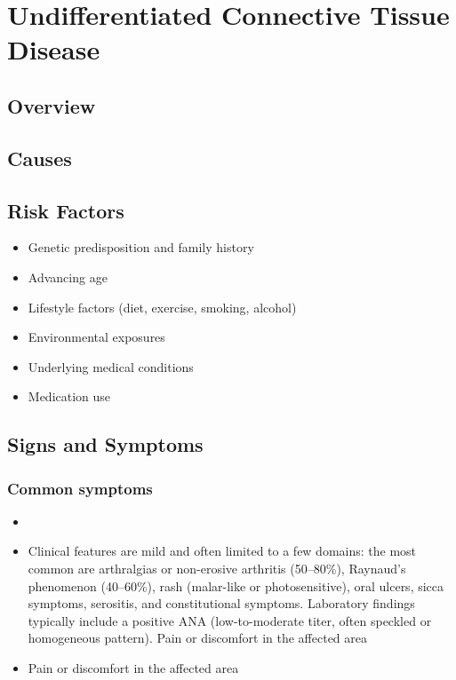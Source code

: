 \chapter{Undifferentiated Connective Tissue Disease}
\label{sec:Undifferentiated Connective Tissue Disease}

\section{Overview}

\section{Causes}
\section{Risk Factors}

\begin{itemize}[noitemsep]
  \item Genetic predisposition and family history
  \item Advancing age
  \item Lifestyle factors (diet, exercise, smoking, alcohol)
  \item Environmental exposures
  \item Underlying medical conditions
  \item Medication use
\end{itemize}
\section{Signs and Symptoms}

\subsection{Common symptoms}
\begin{itemize}[noitemsep]
  \item \item Clinical features are mild and often limited to a few domains: the most common are arthralgias or non-erosive arthritis (50--80\%), Raynaud's phenomenon (40--60\%), rash (malar-like or photosensitive), oral ulcers, sicca symptoms, serositis, and constitutional symptoms. Laboratory findings typically include a positive ANA (low-to-moderate titer, often speckled or homogeneous pattern). Pain or discomfort in the affected area    \item Pain or discomfort in the affected area
  \end{itemize}

